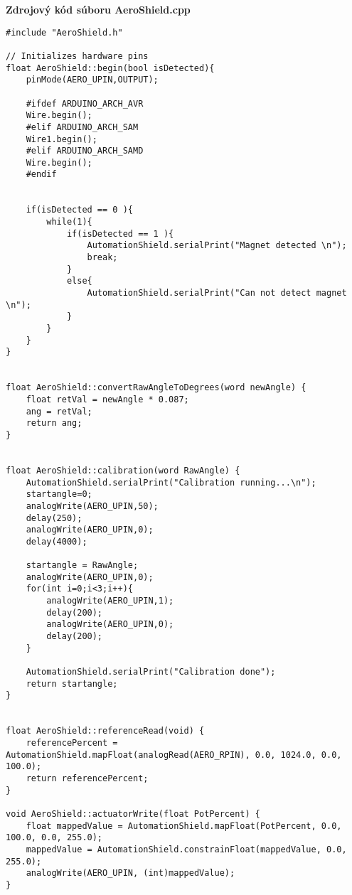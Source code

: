 \LARGE\bf{Zdrojový kód súboru AeroShield.cpp}
\vspace{1cm}
\begin{lstlisting}[caption={Zdrojový kód súboru AeroShield.cpp.},captionpos=b]	
#include "AeroShield.h"     

// Initializes hardware pins
float AeroShield::begin(bool isDetected){   
	pinMode(AERO_UPIN,OUTPUT);  		   
	
	#ifdef ARDUINO_ARCH_AVR      
	Wire.begin();                            
	#elif ARDUINO_ARCH_SAM                            
	Wire1.begin();                
	#elif ARDUINO_ARCH_SAMD         
	Wire.begin();                            
	#endif
	
	
	if(isDetected == 0 ){                
		while(1){                                    
			if(isDetected == 1 ){                          
				AutomationShield.serialPrint("Magnet detected \n");
				break;
			}
			else{                                                 
				AutomationShield.serialPrint("Can not detect magnet \n"); 
			}
		}
	}       
} 


float AeroShield::convertRawAngleToDegrees(word newAngle) {
	float retVal = newAngle * 0.087;      
	ang = retVal;                               
	return ang;                  
}


float AeroShield::calibration(word RawAngle) {      
	AutomationShield.serialPrint("Calibration running...\n");  
	startangle=0;                                
	analogWrite(AERO_UPIN,50);              
	delay(250);                              
	analogWrite(AERO_UPIN,0);              
	delay(4000);                           
	
	startangle = RawAngle;                                 
	analogWrite(AERO_UPIN,0);                     
	for(int i=0;i<3;i++){                  
		analogWrite(AERO_UPIN,1);                 
		delay(200);                           
		analogWrite(AERO_UPIN,0);                                
		delay(200);                                     
	}
	
	AutomationShield.serialPrint("Calibration done");
	return startangle;                                         
}


float AeroShield::referenceRead(void) {                                                
	referencePercent = AutomationShield.mapFloat(analogRead(AERO_RPIN), 0.0, 1024.0, 0.0, 100.0);   
	return referencePercent;                                     
}

void AeroShield::actuatorWrite(float PotPercent) {       
	float mappedValue = AutomationShield.mapFloat(PotPercent, 0.0, 100.0, 0.0, 255.0);  
	mappedValue = AutomationShield.constrainFloat(mappedValue, 0.0, 255.0);
	analogWrite(AERO_UPIN, (int)mappedValue);    
}


\end{lstlisting}
